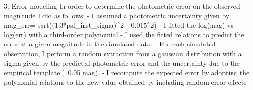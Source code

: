         
        3. Error modeling
        In order to determine the photometric error on the observed magnitude I did as follows:
        - I assumed a photometric uncertainty given by mag_err= sqrt((1.3*psf_inst_sigma)^2+ 0.015^2)
        - I fitted the log(mag) vs log(err) with a third-order polynomial 
        - I used the fitted relations to predict the error at a given magnitude in the simulated data. 
        - For each simulated observation, I perform a random extraction from a gaussian distribution 
        with a sigma given by the predicted photometric error and the uncertainty due to the empirical template (~0.05 mag). 
        - I recompute the expected error by adopting the polynomial relations to the new value obtained by including random error effects
        
        
        






